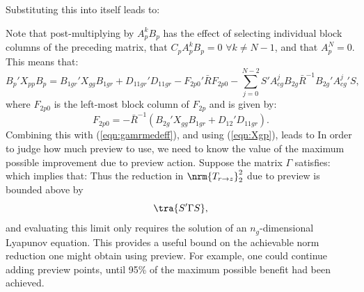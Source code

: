 Substituting this into itself leads to:

%
Note that post-multiplying by $A_p^kB_p$ has the effect of selecting individual block columns of the preceding matrix, that $C_pA_p^kB_p=0 \,\, \forall k \neq N-1$, and that $A_p^N=0$. This means that:
%
\[
B_p'X_{pp}B_p=B_{1gr}'X_{gg}B_{1gr}+D_{11gr}'D_{11gr}-F_{2p0}'\bar{R}F_{2p0} - \sum_{j=0}^{N-2}S' A^j_{cg} B_{2g} {\bar R}^{-1} B_{2g}' {A^j_{cg}}' S,
\]
where $F_{2p0}$ is the left-most block column of $F_{2p}$ and is given by:
\begin{equation}
F_{2p0}=-\bar R^{-1}\left(B_{2g}'X_{gg}B_{1gr}+D_{12}'D_{11gr}\right). \label{eqn:F2p0}
\end{equation}
%
Combining this with (\ref{eqn:gamrmedeff}), and using (\ref{eqn:Xgp}), leads to 
In order to judge how much preview to use, we need to know the value of the maximum possible improvement due to preview action. Suppose the matrix $\Gamma$ satisfies:
which implies that:
Thus the reduction in $\nrm{T_{r\rightarrow z}}_2^2$ due to preview is bounded above by 
\[
\tra{S'\Gamma S},
\]
and evaluating this limit only requires the solution of an $n_g$-dimensional Lyapunov equation.
This provides a useful bound on the achievable norm reduction one might obtain using preview. For example, one could continue adding preview points, until 95\%  of the maximum possible benefit had been achieved. 
